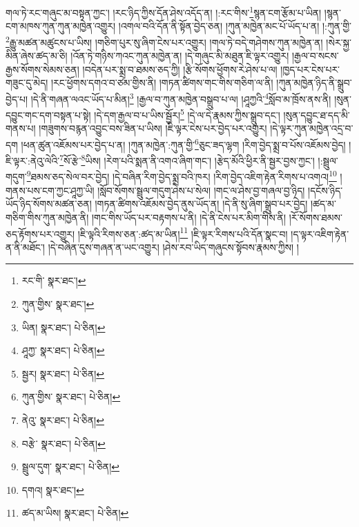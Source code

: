 གལ་ཏེ་རང་གཞུང་མ་བསྟན་ཀྱང་། །རང་ཉིད་ཀྱིས་དོན་ཤེས་འདོད་ན། །:རང་གིས་\footnote{རང་གི་  སྣར་ཐང་། }སྙན་ངག་རྩོམ་པ་ཡིན། །སྙན་ངག་མཁས་ཀུན་ཀུན་མཁྱེན་འགྱུར། །འགལ་བའི་དོན་ནི་སྟོན་བྱེད་ཅན། །ཀུན་མཁྱེན་མང་པོ་ཡོད་པ་ན། །:ཀུན་གྱི་\footnote{ཀུན་གྱིས་  སྣར་ཐང་། }རྒྱུ་མཚན་མཚུངས་པ་ཡིས། །གཅིག་པུར་སུ་ཞིག་ངེས་པར་འགྱུར། །གལ་ཏེ་བདེ་གཤེགས་ཀུན་མཁྱེན་ན། །སེར་སྐྱ་མིན་ཞེས་ཚད་མ་ཅི། །འོན་ཏེ་གཉིས་ཀའང་ཀུན་མཁྱེན་ན། །དེ་གཞུང་མི་མཐུན་ཇི་ལྟར་འགྱུར། །རྒྱལ་བ་སངས་རྒྱས་སོགས་སེམས་ཅན། །བདེན་པར་སྨྲ་བ་ཐམས་ཅད་ཀྱི། །རྩི་སོགས་ཕྱོགས་རེ་ཤེས་པ་ལ། །ཁྱད་པར་ངེས་པར་གཟུང་དུ་མེད། །རང་ཕྱོགས་དགའ་བ་ཙམ་གྱིས་ནི། །གཏན་ཚིགས་གང་གིས་གཅིག་ལ་ནི། །ཀུན་མཁྱེན་ཉིད་ནི་སྒྲུབ་བྱེད་པ། །དེ་ནི་གཞན་ལའང་ཡོད་པ་མིན།\footnote{ཡིན།  སྣར་ཐང་།  པེ་ཅིན། } །རྒྱལ་བ་ཀུན་མཁྱེན་བསྒྲུབ་པ་ལ། །ཤཱཀྱའི་\footnote{ཤཱཀྱ་  སྣར་ཐང་།  པེ་ཅིན། }སློབ་མ་ཁྲོས་ནས་ནི། །སུན་དབྱུང་གང་དག་བསྟན་པ་སྟེ། །དེ་དག་རྒྱལ་བ་པ་ཡིས་སྦྱོར།\footnote{སྦྱར།  སྣར་ཐང་།  པེ་ཅིན། } །དེ་ལ་དེ་རྣམས་ཀྱིས་སྒྲུབ་དང་། །སུན་དབྱུང་ཐ་དད་མི་གནས་པ། །གཟུགས་བརྙན་འབྱུང་བས་ཟིན་པ་ཡིས། །ཇི་ལྟར་ངེས་པར་བྱེད་པར་འགྱུར། །དེ་ལྟར་ཀུན་མཁྱེན་འདྲ་བ་དག །ཕན་ཚུན་འཇོམས་པར་བྱེད་པ་ན། །ཀུན་མཁྱེན་:ཀུན་གྱི་\footnote{ཀུན་གྱིས་  སྣར་ཐང་།  པེ་ཅིན། }ཅུང་ཟད་ལྷག །རིག་བྱེད་སྨྲ་བ་པོས་འཇོམས་བྱེད། །ཇི་ལྟར་:ནེའུ་ལེའི་\footnote{ནེའུ་  སྣར་ཐང་།  པེ་ཅིན། }སོ་རྩེ་\footnote{བརྩེ་  སྣར་ཐང་།  པེ་ཅིན། }ཡིས། །རེག་པའི་སྨན་ནི་འགའ་ཞིག་གང་། །རྩེད་མོའི་ཕྱིར་ནི་སྦྱར་བྱས་ཀྱང་། །:སྦྲུལ་གདུག་\footnote{སྦྲུལ་དུག་  སྣར་ཐང་།  པེ་ཅིན། }ཐམས་ཅད་སེལ་བར་བྱེད། །དེ་བཞིན་རིག་བྱེད་སྨྲ་བའི་ཁར། །རིག་བྱེད་འཇིག་རྟེན་རིགས་པ་འགའ།\footnote{དགའ།  སྣར་ཐང་། } །གནས་པས་ངག་ཀྱང་ཤཱཀྱ་ཡི། །སློབ་སོགས་སྦྲུལ་གདུག་ཤེས་པ་སེལ། །གང་ལ་ཤེས་བྱ་གཞལ་བྱ་ཉིད། །དངོས་ཉིད་ཡོད་ཉིད་སོགས་མཚན་ཅན། །གཏན་ཚིགས་འཇོམས་བྱེད་ནུས་ཡོད་ན། །དེ་ནི་སུ་ཞིག་སྒྲུབ་པར་བྱེད། །ཚད་མ་གཅིག་གིས་ཀུན་མཁྱེན་ནི། །གང་གིས་ཡོད་པར་བརྟགས་པ་ནི། །དེ་ནི་ངེས་པར་མིག་གིས་ནི། །རོ་སོགས་ཐམས་ཅད་རྟོགས་པར་འགྱུར། །ཇི་ལྟའི་རིགས་ཅན་:ཚད་མ་ཡིན།\footnote{ཚད་མ་ཡིས།  སྣར་ཐང་།  པེ་ཅིན། } །ཇི་ལྟར་རིགས་པའི་དོན་སྣང་བ། །ད་ལྟར་འཇིག་རྟེན་ན་ནི་མཐོང་། །དེ་བཞིན་དུས་གཞན་ན་ཡང་འགྱུར། །ཤེས་རབ་ཡིད་གཞུངས་སྟོབས་རྣམས་ཀྱིས། །
